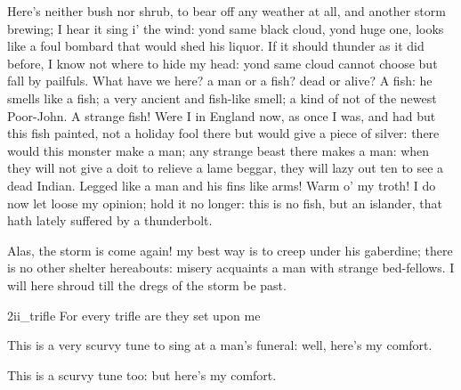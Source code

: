 \begin{prose_speech}[Trinculo] 
Here's neither bush nor shrub, to bear off any weather at all, and another storm brewing; I hear it sing i' the wind: yond same black cloud, yond huge one, looks like a foul bombard that would shed his liquor. If it should thunder as it did before, I know not where to hide my head: yond same cloud cannot choose but fall by pailfuls. What have we here? a man or a fish? dead or alive? A fish: he smells like a fish; a very ancient and fish-like smell; a kind of not of the newest Poor-John. A strange fish! Were I in England now, as once I was, and had but this fish painted, not a holiday fool there but would give a piece of silver: there would this monster make a man; any strange beast there makes a man: when they will not give a doit to relieve a lame beggar, they will lazy out ten to see a dead Indian. Legged like a man and his fins like arms! Warm o' my troth! I do now let loose my opinion; hold it no longer: this is no fish, but an islander, that hath lately suffered by a thunderbolt.


Alas, the storm is come again! my best way is to creep under his gaberdine; there is no other shelter hereabouts: misery acquaints a man with strange bed-fellows. I will here shroud till the dregs of the storm be past.
\end{prose_speech}


\begin{pictures} %
	\begin{letter}
		\begin{colorbigpic}
			[1.1]
			{2ii_trifle}
			{For every trifle are they set upon me}
		\end{colorbigpic}
	\end{letter}
\end{pictures}




\begin{prose_speech}[Stephano] 
\begin{song}
\end{song}
This is a very scurvy tune to sing at a man's funeral: well, here's my comfort. 


\begin{song}
\end{song}

This is a scurvy tune too: but here's my comfort.
\end{prose_speech}



